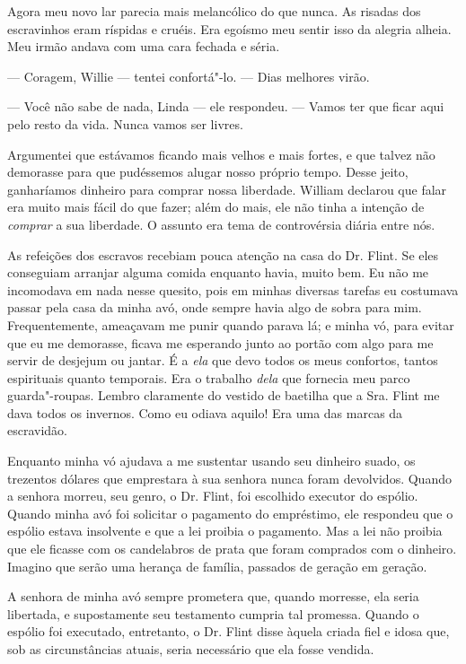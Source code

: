 Agora meu novo lar parecia mais
melancólico do que nunca. As risadas dos escravinhos eram ríspidas e
cruéis. Era egoísmo meu sentir isso da alegria alheia. Meu irmão andava
com uma cara fechada e séria.

--- Coragem, Willie --- tentei confortá"-lo. --- Dias melhores virão.

--- Você não sabe de nada, Linda ---
ele respondeu. --- Vamos ter que ficar aqui pelo resto da vida. Nunca
vamos ser livres.

Argumentei
que estávamos ficando mais velhos e mais fortes, e que talvez não
demorasse para que pudéssemos alugar nosso próprio tempo. Desse jeito,
ganharíamos dinheiro para comprar nossa liberdade. William declarou que
falar era muito mais fácil do que fazer; além do mais, ele não tinha a
intenção de \emph{comprar} a sua liberdade. O assunto era tema de
controvérsia diária entre nós.

As refeições dos escravos recebiam
pouca atenção na casa do Dr. Flint. Se eles conseguiam arranjar alguma
comida enquanto havia, muito bem. Eu não me incomodava em nada nesse
quesito, pois em minhas diversas tarefas eu costumava passar pela casa
da minha avó, onde sempre havia algo de sobra para mim. Frequentemente,
ameaçavam me punir quando parava lá; e minha vó, para evitar que eu me
demorasse, ficava me esperando junto ao portão com algo para me servir
de desjejum ou jantar. É a \emph{ela} que devo todos os meus confortos,
tantos espirituais quanto temporais. Era o trabalho \emph{dela} que
fornecia meu parco guarda"-roupas. Lembro claramente do vestido de
baetilha que a Sra. Flint me dava todos os invernos. Como eu odiava
aquilo! Era uma das marcas da escravidão.

Enquanto minha vó ajudava a me
sustentar usando seu dinheiro suado, os trezentos dólares que emprestara
à sua senhora nunca foram devolvidos. Quando a senhora morreu, seu
genro, o Dr. Flint, foi escolhido executor do espólio. Quando minha avó
foi solicitar o pagamento do empréstimo, ele respondeu que o espólio
estava insolvente e que a lei proibia o pagamento. Mas a lei não proibia
que ele ficasse com os candelabros de prata que foram comprados com o
dinheiro. Imagino que serão uma herança de família, passados de geração
em geração.

A senhora de minha avó sempre prometera
que, quando morresse, ela seria libertada, e supostamente seu testamento
cumpria tal promessa. Quando o espólio foi executado, entretanto, o Dr.
Flint disse àquela criada fiel e idosa que, sob as circunstâncias
atuais, seria necessário que ela fosse vendida.


